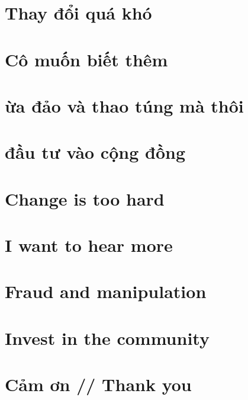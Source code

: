 \documentclass[
]{book}
\begin{document}
\hypertarget{thay-ux111ux1ed5i-quuxe1-khuxf3}{%
\chapter{Thay đổi quá khó}\label{thay-ux111ux1ed5i-quuxe1-khuxf3}}

\hypertarget{cuxf4-muux1ed1n-biux1ebft-thuxeam}{%
\chapter{Cô muốn biết thêm}\label{cuxf4-muux1ed1n-biux1ebft-thuxeam}}

\hypertarget{ux1eeba-ux111ux1ea3o-vuxe0-thao-tuxfang-muxe0-thuxf4i}{%
\chapter{ừa đảo và thao túng mà thôi}\label{ux1eeba-ux111ux1ea3o-vuxe0-thao-tuxfang-muxe0-thuxf4i}}

\hypertarget{ux111ux1ea7u-tux1b0-vuxe0o-cux1ed9ng-ux111ux1ed3ng}{%
\chapter{đầu tư vào cộng đồng}\label{ux111ux1ea7u-tux1b0-vuxe0o-cux1ed9ng-ux111ux1ed3ng}}

\hypertarget{change-is-too-hard}{%
\chapter{Change is too hard}\label{change-is-too-hard}}

\hypertarget{i-want-to-hear-more}{%
\chapter{I want to hear more}\label{i-want-to-hear-more}}

\hypertarget{fraud-and-manipulation}{%
\chapter{Fraud and manipulation}\label{fraud-and-manipulation}}

\hypertarget{invest-in-the-community}{%
\chapter{Invest in the community}\label{invest-in-the-community}}

\hypertarget{cux1ea3m-ux1a1n-thank-you}{%
\chapter{Cảm ơn // Thank you}\label{cux1ea3m-ux1a1n-thank-you}}
\end{document}
